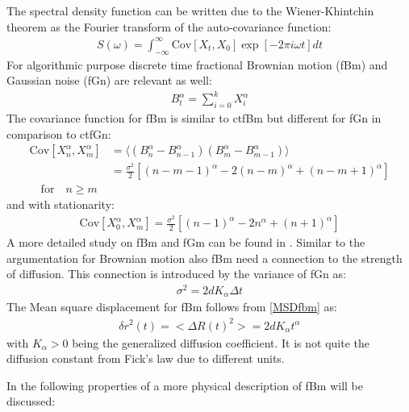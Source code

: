 \documentclass[
  a4paper,BCOR10mm,oneside,
  headsepline,footsepline,%
  fleqn,openbib
]{scrbook}
\begin{document}
The spectral density function can be written due to the Wiener-Khintchin theorem as the Fourier transform of the auto-covariance function:
\begin{align}
 S(\omega)= \int^{\infty}_{-\infty} \mathrm{Cov}[X_t,X_0] \exp[-2 \pi i \omega t] dt
\end{align}
For algorithmic purpose discrete time fractional Brownian motion (fBm) and Gaussian noise (fGn) are relevant as well:
\begin{align}
B^{\alpha}_{t}= \sum_{i=0}^kX^{\alpha}_i
\end{align}
The covariance function for fBm is similar to ctfBm but different for fGn in comparison to ctfGn:
\begin{align*}
 \mathrm{Cov}[X^{\alpha}_n,X^{\alpha}_m]&=\langle (B^{\alpha}_n-B^{\alpha}_{n-1}) (B^{\alpha}_m-B^{\alpha}_{m-1})\rangle \\ &=\frac{\sigma^2}{2}[(n-m-1)^{\alpha}-2(n-m)^{\alpha}+(n-m+1)^{\alpha}]\\ \quad \text{for}  \quad n\geq m
\end{align*}
and with stationarity:
\begin{align}
 \mathrm{Cov}[X^{\alpha}_0,X^{\alpha}_m]=\frac{\sigma^2}{2}[(n-1)^{\alpha}-2n^{\alpha}+(n+1)^{\alpha}]
\end{align}
A more detailed study on fBm and fGm can be found in \cite{qian2003fractional}. Similar to the argumentation for Brownian motion also fBm need a connection to the strength of diffusion. This connection is introduced by the variance of fGn as: 
\begin{align}
\label{diffusionvariance}
\sigma^2=2dK_{\alpha} \Delta t
\end{align}
The Mean square displacement for fBm follows from \cref{MSDfbm} as:
\begin{align}
\delta r^{2}(t)= < \Delta R(t)^2>=2dK_{\alpha} t^{\alpha}
\end{align}
with $K_{\alpha}>0$  being the generalized diffusion coefficient. It is not quite the diffusion constant from Fick's law due to different units.
\par
In the following properties of a more physical description of fBm will be discussed:
\end{document}
